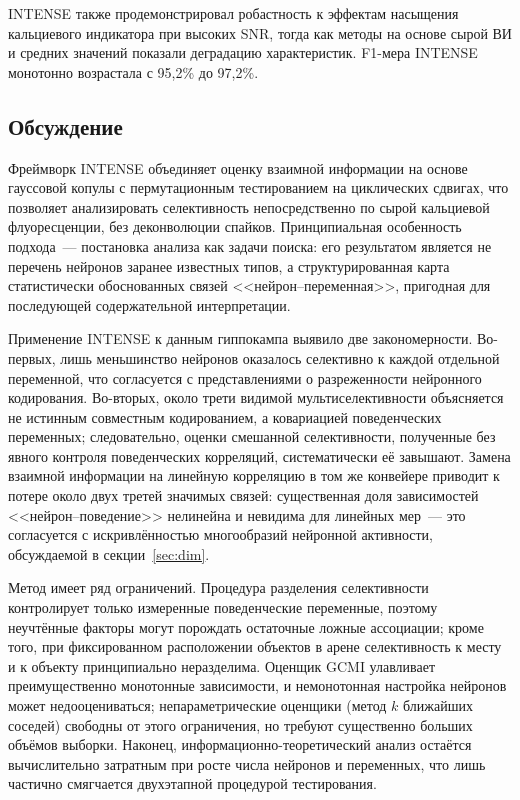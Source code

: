 INTENSE также продемонстрировал робастность к эффектам насыщения кальциевого индикатора при высоких SNR, тогда как методы на основе сырой ВИ и средних значений показали деградацию характеристик. F1-мера INTENSE монотонно возрастала с 95{,}2\% до 97{,}2\%.

\subsection{Обсуждение}\label{sec:intense_discussion}

Фреймворк INTENSE объединяет оценку взаимной информации на основе гауссовой копулы с пермутационным тестированием на циклических сдвигах, что позволяет анализировать селективность непосредственно по сырой кальциевой флуоресценции, без деконволюции спайков. Принципиальная особенность подхода~--- постановка анализа как задачи поиска: его результатом является не перечень нейронов заранее известных типов, а структурированная карта статистически обоснованных связей <<нейрон--переменная>>, пригодная для последующей содержательной интерпретации.

Применение INTENSE к данным гиппокампа выявило две закономерности. Во-первых, лишь меньшинство нейронов оказалось селективно к каждой отдельной переменной, что согласуется с представлениями о разреженности нейронного кодирования. Во-вторых, около трети видимой мультиселективности объясняется не истинным совместным кодированием, а ковариацией поведенческих переменных; следовательно, оценки смешанной селективности, полученные без явного контроля поведенческих корреляций, систематически её завышают. Замена взаимной информации на линейную корреляцию в том же конвейере приводит к потере около двух третей значимых связей: существенная доля зависимостей <<нейрон--поведение>> нелинейна и невидима для линейных мер~--- это согласуется с искривлённостью многообразий нейронной активности, обсуждаемой в секции~\ref{sec:dim}.

Метод имеет ряд ограничений. Процедура разделения селективности контролирует только измеренные поведенческие переменные, поэтому неучтённые факторы могут порождать остаточные ложные ассоциации; кроме того, при фиксированном расположении объектов в арене селективность к месту и к объекту принципиально неразделима. Оценщик GCMI улавливает преимущественно монотонные зависимости, и немонотонная настройка нейронов может недооцениваться; непараметрические оценщики (метод $k$ ближайших соседей) свободны от этого ограничения, но требуют существенно больших объёмов выборки. Наконец, информационно-теоретический анализ остаётся вычислительно затратным при росте числа нейронов и переменных, что лишь частично смягчается двухэтапной процедурой тестирования.

